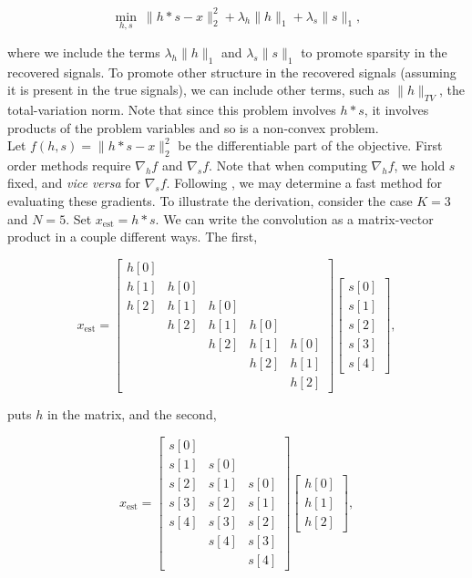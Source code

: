 \documentclass[journal]{IEEEtran}
\begin{document}
\[ \min_{h,s}~ \|h\ast s-x\|_2^2 + \lambda_h\|h\|_1 + \lambda_s \|s\|_1, \] 

\noindent where we include the terms $\lambda_h\|h\|_1$ and $\lambda_s\|s\|_1$ to promote sparsity in the recovered signals.  To promote other structure in the recovered signals (assuming it is present in the true signals), we can include other terms, such as $\|h\|_{TV}$, the total-variation norm.  Note that since this problem involves $h\ast s$, it involves products of the problem variables and so is a non-convex problem.\\

Let $f(h,s)=\|h\ast s -x\|_2^2$ be the differentiable part of the objective.  First order methods require $\nabla_hf$ and $\nabla_sf$.  Note that when computing $\nabla_hf$, we hold $s$ fixed, and \emph{vice versa} for $\nabla_sf$.  Following \cite{claerbout_1992}, we may determine a fast method for evaluating these gradients.  To illustrate the derivation, consider the case $K=3$ and $N=5$.  Set $x_\text{est}=h\ast s$.  We can write the convolution as a matrix-vector product in a couple different ways.  The first,

\[ x_\text{est} = \begin{bmatrix} h[0]\\h[1]&h[0]\\h[2]&h[1]&h[0]\\&h[2]&h[1]&h[0]\\&&h[2]&h[1]&h[0]\\&&&h[2]&h[1]\\&&&&h[2]\end{bmatrix}\begin{bmatrix}s[0]\\s[1]\\s[2]\\s[3]\\s[4]\end{bmatrix}, \] 

\noindent puts $h$ in the matrix, and the second,

\[ x_\text{est} = \begin{bmatrix} s[0]\\s[1]&s[0]\\s[2]&s[1]&s[0]\\s[3]&s[2]&s[1]\\s[4]&s[3]&s[2]\\&s[4]&s[3]\\&&s[4]\end{bmatrix}\begin{bmatrix}h[0]\\h[1]\\h[2]\end{bmatrix}, \] 
\end{document}
